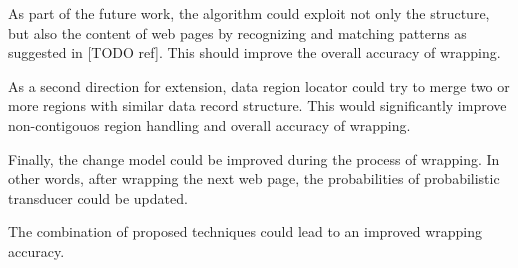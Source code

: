 As part of the future work, the algorithm could exploit not only the structure, but also the content of web pages by recognizing and matching patterns as suggested in [TODO ref]. This should improve the overall accuracy of wrapping.

As a second direction for extension, data region locator could try to merge two or more regions with similar data record structure. This would significantly improve non-contigouos region handling and overall accuracy of wrapping.

Finally, the change model could be improved during the process of wrapping. In other words, after wrapping the next web page, the probabilities of probabilistic transducer could be updated.

The combination of proposed techniques could lead to an improved wrapping accuracy.


